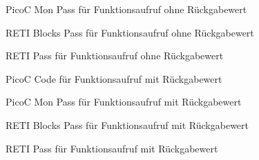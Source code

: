\begin{figure}[H]
  \centering
  \caption{PicoC Mon Pass für Funktionsaufruf ohne Rückgabewert}
  \label{fig:picoc_mon_pass_für_funktionsaufruf_ohne_rückgabewert}
\end{figure}

\begin{figure}[H]
  \centering
  \caption{RETI Blocks Pass für Funktionsaufruf ohne Rückgabewert}
  \label{fig:reti_blocks_pass_für_funktionsaufruf_ohne_rückgabewert}
\end{figure}

\begin{figure}[H]
  \centering
  \caption{RETI Pass für Funktionsaufruf ohne Rückgabewert}
  \label{fig:reti_pass_für_funktionsaufruf_ohne_rückgabewert}
\end{figure}


\begin{figure}[H]
  \centering
  \caption{PicoC Code für Funktionsaufruf mit Rückgabewert}
  \label{fig:picoc_code_für_funktionsaufruf_mit_rückgabewert}
\end{figure}

\begin{figure}[H]
  \centering
  \caption{PicoC Mon Pass für Funktionsaufruf mit Rückgabewert}
  \label{fig:picoc_mon_pass_für_funktionsaufruf_mit_rückgabewert}
\end{figure}

\begin{figure}[H]
  \centering
  \caption{RETI Blocks Pass für Funktionsaufruf mit Rückgabewert}
  \label{fig:reti_blocks_pass_für_funktionsaufruf_mit_rückgabewert}
\end{figure}

\begin{figure}[H]
  \centering
  \caption{RETI Pass für Funktionsaufruf mit Rückgabewert}
  \label{fig:reti_pass_für_funktionsaufruf_mit_rückgabewert}
\end{figure}

